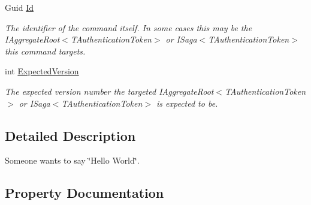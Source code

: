 \begin{DoxyCompactItemize}
Guid \hyperlink{classCqrs_1_1Akka_1_1Tests_1_1Unit_1_1Commands_1_1SayHelloWorldCommand_af409b36bce4c0cef726f3fd8869ec5ba_af409b36bce4c0cef726f3fd8869ec5ba}{Id}
\begin{DoxyCompactList}\small\item\em The identifier of the command itself. In some cases this may be the I\+Aggregate\+Root$<$\+T\+Authentication\+Token$>$ or I\+Saga$<$\+T\+Authentication\+Token$>$ this command targets. \end{DoxyCompactList}\item 
int \hyperlink{classCqrs_1_1Akka_1_1Tests_1_1Unit_1_1Commands_1_1SayHelloWorldCommand_a422ec8f8e6319ab369f9ad7949e97fcc_a422ec8f8e6319ab369f9ad7949e97fcc}{Expected\+Version}
\begin{DoxyCompactList}\small\item\em The expected version number the targeted I\+Aggregate\+Root$<$\+T\+Authentication\+Token$>$ or I\+Saga$<$\+T\+Authentication\+Token$>$ is expected to be. \end{DoxyCompactList}\end{DoxyCompactItemize}


\subsection{Detailed Description}
Someone wants to say \char`\"{}\+Hello World\char`\"{}. 



\subsection{Property Documentation}
\mbox{\label{classCqrs_1_1Akka_1_1Tests_1_1Unit_1_1Commands_1_1SayHelloWorldCommand_adfabda7d8bf843f643f29368cc7fdad9_adfabda7d8bf843f643f29368cc7fdad9}} 
